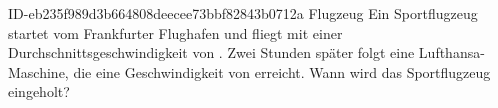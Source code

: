 \begin{exercise}
      {ID-eb235f989d3b664808deecee73bbf82843b0712a}
      {Flugzeug}
  \ifproblem\problem
    Ein Sportflugzeug startet vom Frankfurter Flughafen und fliegt mit einer
    Durchschnittsgeschwindigkeit von . Zwei Stunden später folgt eine
    Lufthansa-Maschine, die eine Geschwindigkeit von  erreicht.
    Wann wird das Sportflugzeug eingeholt?
  \fi
\end{exercise}

